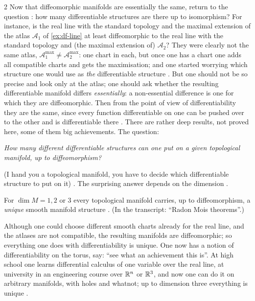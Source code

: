 \begin{paracol}{2}
Now that diffeomorphic manifolds are essentially the same, return to the question : how many differentiable structures are there up to isomorphism? For instance, is the real line with the standard topology and the maximal extension of the atlas $\mathcal A_1$ of \cref{ex:df-line} at
least diffeomorphic to the real line with the standard topology and (the maximal extension of) $\mathcal A_2$? They were clearly not the same atlas, $\mathcal A_1^{\max}\ne\mathcal A_2^{\max}$: one chart in each, but once one has a chart one adds all compatible charts and gets the maximisation; and one started worrying which
structure one would use as \emph{the} differentiable structure . But one should not be so precise and look only at the atlas; one should ask whether the resulting differentiable manifold differs \emph{essentially}: a non-essential difference
is one for which they are diffeomorphic. Then from the point of view of differentiability they are the same, since every function differentiable on one can be pushed over to the other and is differentiable there .
There are rather deep results, not proved here, some of them big achievements. The question:
\begin{center}\emph{How many different differentiable structures can one put on a given topological manifold, up to diffeomorphism?}\end{center}
(I hand you a topological manifold, you have to decide which differentiable structure to put on it) . The surprising answer depends on the dimension .

\begin{theorem}\label{thm:df-low}
For $\dim M=1,2$ or $3$ every topological manifold carries, up to diffeomorphism, a \emph{unique} smooth manifold structure . (In the transcript: ``Radon Mois theorems''.)
\end{theorem}
Although one could choose different smooth charts already for the real line, and the atlases are not compatible, the resulting manifolds are diffeomorphic; so everything one does with differentiability is unique. One now has a notion of differentiability on the torus, say: ``see what an achievement this is''. At high school one learns
differential calculus of one variable over the real line, at university in an engineering course over $\mathbb{R}^n$ or $\mathbb{R}^3$, and now one can do it on arbitrary manifolds, with holes and whatnot; up to dimension three everything is unique .


\end{paracol}
